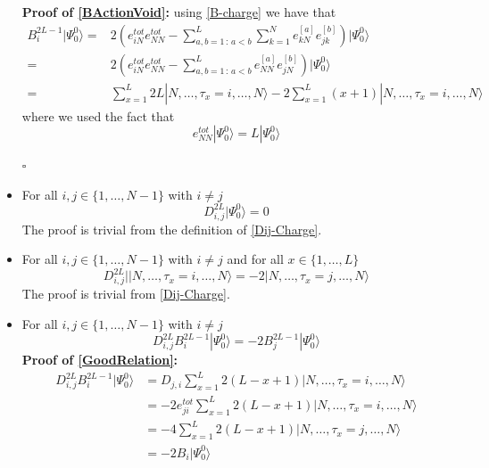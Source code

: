 \documentclass[10pt]{article}
\numberwithin{equation}{section}
\numberwithin{equation}{subsection}
\begin{document}
\begin{itemize}
\textbf{Proof of \eqref{BActionVoid}: } using \eqref{B-charge} we have that 
\begin{align}
	B_{i}^{2L-1}|\Psi_{0}^{0}\rangle=&2 \left(e_{iN}^{tot}e_{NN}^{tot}-\sum_{a,b=1\,:\,a<b}^{L}\sum_{k=1}^{N}e_{kN}^{[a]}e_{jk}^{[b]}\right)|\Psi_{0}^{0}\rangle\nonumber
	\\=&
	2\left(e_{iN}^{tot}e_{NN}^{tot}-\sum_{a,b=1\,:\,a<b}^{L}e_{NN}^{[a]}e_{jN}^{[b]}\right)|\Psi_{0}^{0}\rangle\nonumber\\=&
	\sum_{x=1}^{L}2L|N,\ldots,\tau_{x}=i,\ldots,N\rangle -2\sum_{x=1}^{L}(x+1)|N,\ldots,\tau_{x}=i,\ldots,N\rangle
\end{align}
where we used the fact that 
\begin{equation}
	 e_{NN}^{tot}|\Psi_{0}^{0}\rangle=L|\Psi_{0}^{0}\rangle
\end{equation}
\begin{flushright}
	$\square$
\end{flushright}
\item For all $i,j\in\{1,\ldots,N-1\}$ with $i\neq j$
\begin{equation}\label{Dij-ref}
	D_{i,j}^{2L}|\Psi_{0}^{0}\rangle=0
\end{equation}
The proof is trivial from the definition of \eqref{Dij-Charge}. 
\item For all $i,j\in\{1,\ldots,N-1\}$ with $i\neq j$ and for all $x\in\{1,\ldots,L\}$ 
\begin{equation}
	D_{i,j}^{2L}||N,\ldots,\tau_{x}=i,\ldots,N\rangle=-2|N,\ldots,\tau_{x}=j,\ldots,N\rangle
\end{equation}
The proof is trivial from \eqref{Dij-Charge}. 
\item For all $i,j\in\{1,\ldots,N-1\}$ with $i\neq j$ 
\begin{equation}\label{GoodRelation}
	D_{i,j}^{2L}B_{i}^{2L-1}|\Psi_{0}^{0}\rangle=-2B_{j}^{2L-1}|\Psi_{0}^{0}\rangle
\end{equation}
\textbf{Proof of \eqref{GoodRelation}:}
\begin{align}
	D_{i,j}^{2L}B_{i}^{2L-1}|\Psi_{0}^{0}\rangle&= D_{j,i}\sum_{x=1}^{L}2(L-x+1)|N,\ldots,\tau_{x}=i,\ldots,N\rangle\nonumber
	\\&=
	-2e_{ji}^{tot}\sum_{x=1}^{L}2(L-x+1)|N,\ldots,\tau_{x}=i,\ldots,N\rangle\nonumber
	\\&=
	-4\sum_{x=1}^{L}2(L-x+1)|N,\ldots,\tau_{x}=j,\ldots,N\rangle\nonumber
	\\&=
	-2B_{i}|\Psi_{0}^{0}\rangle
\end{align}
\begin{flushright}

\end{flushright}
\end{itemize}
\end{document}
